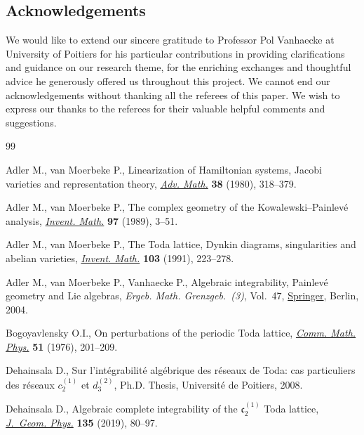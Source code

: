 \documentclass[10pt,a4paper]{amsart}
\numberwithin{equation}{section}
\begin{document}
\subsection*{Acknowledgements}
We would like to extend our sincere gratitude to Professor Pol
Vanhaecke at University of Poitiers for his particular contributions
in providing clarifications and guidance on our research theme, for
the enriching exchanges and thoughtful advice he generously offered
us throughout this project. We cannot end our acknowledgements
without thanking all the referees of this paper. We wish to express
our thanks to the referees for their valuable helpful comments and
suggestions.

\begin{thebibliography}{99}
\footnotesize\itemsep=0pt


Adler M., van Moerbeke P., Linearization of {H}amiltonian systems, {J}acobi
 varieties and representation theory, \href{https://doi.org/10.1016/0001-8708(80)90008-0}{\textit{Adv. Math.}} \textbf{38} (1980),
 318--379.

Adler M., van Moerbeke P., The complex geometry of the
 {K}owalewski--{P}ainlev\'e analysis, \href{https://doi.org/10.1007/BF01850654}{\textit{Invent. Math.}} \textbf{97}
 (1989), 3--51.

Adler M., van Moerbeke P., The {T}oda lattice, {D}ynkin diagrams, singularities
 and abelian varieties, \href{https://doi.org/10.1007/BF01239513}{\textit{Invent. Math.}} \textbf{103} (1991), 223--278.

Adler M., van Moerbeke P., Vanhaecke P., Algebraic integrability, {P}ainlev\'e
 geometry and {L}ie algebras, \textit{Ergeb. Math. Grenzgeb.~(3)}, Vol.~47,
 \href{https://doi.org/10.1007/978-3-662-05650-9}{Springer}, Berlin, 2004.

Bogoyavlensky O.I., On perturbations of the periodic {T}oda lattice,
 \href{https://doi.org/10.1007/BF01617919}{\textit{Comm. Math. Phys.}} \textbf{51} (1976), 201--209.

Dehainsala D., Sur l'int\'egrabilit\'e alg\'ebrique des r\'eseaux de {T}oda:
 cas particuliers des r\'eseaux $c_2^{(1)}$ et $d_3^{(2)}$, Ph.D. Thesis,
 {U}niversit\'e de Poitiers, 2008.

Dehainsala D., Algebraic complete integrability of the {$\mathfrak c_2^{(1)}$}
 {T}oda lattice, \href{https://doi.org/10.1016/j.geomphys.2018.09.008}{\textit{J.~Geom. Phys.}} \textbf{135} (2019), 80--97.


\end{thebibliography}
\end{document}

